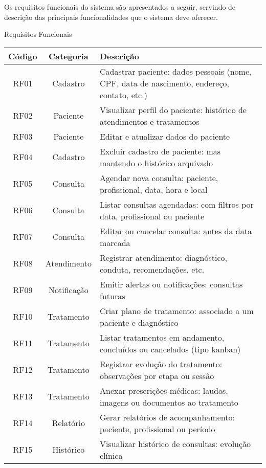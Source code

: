 Os requisitos funcionais do sistema são apresentados a seguir, servindo de descrição das principais funcionalidades que o sistema deve oferecer.

\renewcommand{\arraystretch}{1.5} %

\begin{quadro}[!htbp]
    \caption{\label{quadro_requisitos_f1}Requisitos Funcionais}
    \small
    \begin{tabular}{|c|c|p{10cm}|}
        \hline
        \textbf{Código} & \textbf{Categoria} & \textbf{Descrição} \\ \hline
        RF01   & Cadastro     & Cadastrar paciente: dados pessoais (nome, CPF, data de nascimento, endereço, contato, etc.) \\ \hline
        RF02   & Paciente     & Visualizar perfil do paciente: histórico de atendimentos e tratamentos \\ \hline
        RF03   & Paciente     & Editar e atualizar dados do paciente \\ \hline
        RF04   & Cadastro     & Excluir cadastro de paciente: mas mantendo o histórico arquivado \\ \hline
        RF05   & Consulta     & Agendar nova consulta: paciente, profissional, data, hora e local \\ \hline
        RF06   & Consulta     & Listar consultas agendadas: com filtros por data, profissional ou paciente \\ \hline
        RF07   & Consulta     & Editar ou cancelar consulta: antes da data marcada \\ \hline
        RF08   & Atendimento  & Registrar atendimento: diagnóstico, conduta, recomendações, etc. \\ \hline
        RF09   & Notificação  & Emitir alertas ou notificações: consultas futuras \\ \hline
        RF10   & Tratamento   & Criar plano de tratamento: associado a um paciente e diagnóstico \\ \hline
        RF11   & Tratamento   & Listar tratamentos em andamento, concluídos ou cancelados (tipo kanban) \\ \hline
        RF12   & Tratamento   & Registrar evolução do tratamento: observações por etapa ou sessão \\ \hline
        RF13   & Tratamento   & Anexar prescrições médicas: laudos, imagens ou documentos ao tratamento \\ \hline
        RF14   & Relatório    & Gerar relatórios de acompanhamento: paciente, profissional ou período \\ \hline
        RF15   & Histórico    & Visualizar histórico de consultas: evolução clínica \\ \hline


    \end{tabular}
\end{quadro}

